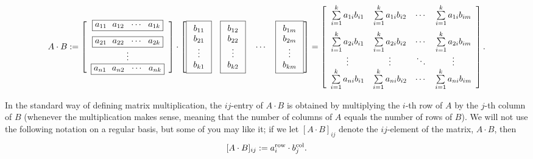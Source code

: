 \begin{equation}
\label{eq:RowColumnMatrixMultiplication}
   A \cdot B:=  \left[\begin{array}{c}\boxed{a_{11}~~ a_{12}~~ \cdots~~ a_{1k}}  \medskip \\
\boxed{a_{21}~~ a_{22}~~ \cdots~~ a_{2k}} \\
\vdots \\
\boxed{a_{n1}~~ a_{n2}~~ \cdots~~ a_{nk}}\end{array}\right] \cdot 
\left[ \boxed{\begin{array}{c} b_{11} \\ b_{21}\\ \vdots \\ b_{k1}\end{array} }~~~
\boxed{\begin{array}{c} b_{12} \\ b_{22}\\ \vdots \\ b_{k2}\end{array} }~~~\cdots~~~
\boxed{\begin{array}{c} b_{1m} \\ b_{2m}\\ \vdots \\ b_{km}\end{array} }\right] =
%
\left[\begin{array}{cccc}  \sum\limits_{i=1}^k a_{1i}b_{i1} & \sum\limits_{i=1}^k a_{1i}b_{i2} & \cdots & \sum\limits_{i=1}^k a_{1i}b_{im}  \medskip \\
 \sum\limits_{i=1}^k a_{2i}b_{i1} & \sum\limits_{i=1}^k a_{2i}b_{i2} & \cdots & \sum\limits_{i=1}^k a_{2i}b_{im} \\
\vdots & \vdots & \ddots & \vdots \\
 \sum\limits_{i=1}^k a_{ni}b_{i1} & \sum\limits_{i=1}^k a_{ni}b_{i2} & \cdots & \sum\limits_{i=1}^k a_{ni}b_{im} \\
\end{array}\right].
\end{equation}

\begin{tcolorbox}[title=\textbf{Bottom Line on Standard Multiplication}] In the standard way of defining matrix multiplication, the
 $ij$-entry of $A \cdot B$ is obtained by multiplying the $i$-th row of $A$ by the $j$-th column of $B$ (whenever the multiplication makes sense, meaning that the number of columns of $A$ equals the number of rows of $B$). We will not use the following notation on a regular basis, but some of you may like it; if we let $[A \cdot B]_{ij}$ denote the $ij$-element of the matrix, $A\cdot B$, then 
 $$[A \cdot B]_{ij} := a_i^{\rm row} \cdot b_j^{\rm col}. $$
\end{tcolorbox}
 



